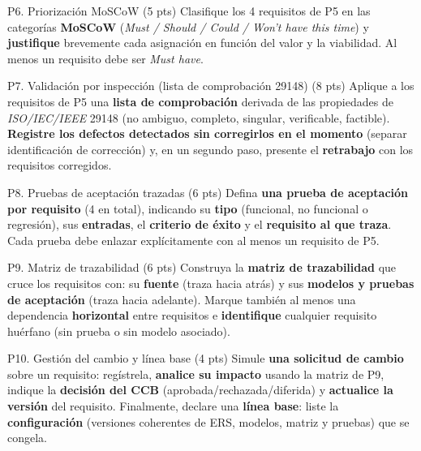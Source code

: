 \documentclass[11pt,a4paper,oneside]{article}
\begin{document}
\begin{tarea}{P6. Priorizaci\'on MoSCoW \hfill (5 pts)}
Clasifique los 4 requisitos de P5 en las categor\'ias \textbf{MoSCoW} (\textit{Must / Should / Could / Won't have this time}) y \textbf{justifique} brevemente cada asignaci\'on en funci\'on del valor y la viabilidad. Al menos un requisito debe ser \textit{Must have}.
\end{tarea}

\begin{tarea}{P7. Validaci\'on por inspecci\'on (lista de comprobaci\'on 29148) \hfill (8 pts)}
Aplique a los requisitos de P5 una \textbf{lista de comprobaci\'on} derivada de las propiedades de \textit{ISO/IEC/IEEE} 29148 (no ambiguo, completo, singular, verificable, factible). \textbf{Registre los defectos detectados sin corregirlos en el momento} (separar identificaci\'on de correcci\'on) y, en un segundo paso, presente el \textbf{retrabajo} con los requisitos corregidos.
\end{tarea}

\begin{tarea}{P8. Pruebas de aceptaci\'on trazadas \hfill (6 pts)}
Defina \textbf{una prueba de aceptaci\'on por requisito} (4 en total), indicando su \textbf{tipo} (funcional, no funcional o regresi\'on), sus \textbf{entradas}, el \textbf{criterio de \'exito} y el \textbf{requisito al que traza}. Cada prueba debe enlazar expl\'icitamente con al menos un requisito de P5.
\end{tarea}

\begin{tarea}{P9. Matriz de trazabilidad \hfill (6 pts)}
Construya la \textbf{matriz de trazabilidad} que cruce los requisitos con: su \textbf{fuente} (traza hacia atr\'as) y sus \textbf{modelos y pruebas de aceptaci\'on} (traza hacia adelante). Marque tambi\'en al menos una dependencia \textbf{horizontal} entre requisitos e \textbf{identifique} cualquier requisito hu\'erfano (sin prueba o sin modelo asociado).
\end{tarea}

\begin{tarea}{P10. Gesti\'on del cambio y l\'inea base \hfill (4 pts)}
Simule \textbf{una solicitud de cambio} sobre un requisito: reg\'istrela, \textbf{analice su impacto} usando la matriz de P9, indique la \textbf{decisi\'on del CCB} (aprobada/rechazada/diferida) y \textbf{actualice la versi\'on} del requisito. Finalmente, declare una \textbf{l\'inea base}: liste la \textbf{configuraci\'on} (versiones coherentes de ERS, modelos, matriz y pruebas) que se congela.
\end{tarea}
\end{document}
